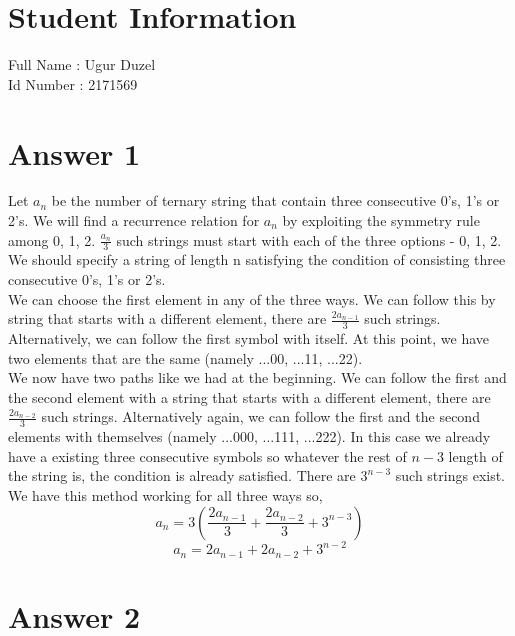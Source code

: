 \documentclass[12pt]{article}
\begin{document}
	
\section*{Student Information } 
Full Name : Ugur Duzel \\
Id Number : 2171569  \\

\section*{Answer 1}
Let $a_n$ be the number of ternary string that contain three consecutive 0's, 1's or 2's. We will find a recurrence relation for $a_n$ by exploiting the symmetry rule among 0, 1, 2. $\frac{a_n}{3}$ such strings must start with each of the three options - 0, 1, 2. We should specify a string of length n satisfying the condition of consisting three consecutive 0's, 1's or 2's. \\
We can choose the first element in any of the three ways. We can follow this by string that starts with a different element, there are $\frac{2a_{n-1}}{3}$ such strings. Alternatively, we can follow the first symbol with itself. At this point, we have two elements that are the same (namely ...00, ...11, ...22). \\
We now have two paths like we had at the beginning. We can follow the first and the second element with a string that starts with a different element, there are $\frac{2a_{n-2}}{3}$ such strings. Alternatively again, we can follow the first and the second elements with themselves (namely ...000, ...111, ...222). In this case we already have a existing three consecutive symbols so whatever the rest of $n-3$ length of the string is, the condition is already satisfied. There are $3^{n-3}$ such strings exist. \\
We have this method working for all three ways so,
$$a_n=3(\frac{2a_{n-1}}{3}+\frac{2a_{n-2}}{3}+3^{n-3})$$
$$a_n=2a_{n-1}+2a_{n-2}+3^{n-2}$$


\section*{Answer 2}
\end{document}
